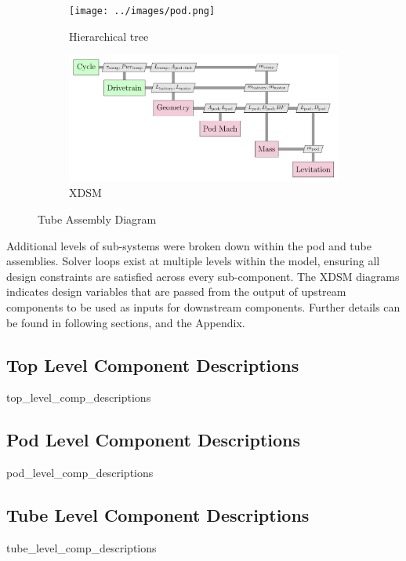 \begin{figure}
\centering
\begin{subfigure}{.5\textwidth}
  \centering
  \texttt{[image: ../images/pod.png]}
  \caption{Hierarchical tree}
  \label{fig:tree:pod}
\end{subfigure}%
\begin{subfigure}{.5\textwidth}
  \centering
  \includegraphics{../images/xdsm/pod.pdf}
  \caption{XDSM}
  \label{fig:xdsm:pod}
\end{subfigure}
\caption{Tube Assembly Diagram}
\label{fig:pod}
\end{figure}

Additional levels of sub-systems were broken down within the pod and tube assemblies.
Solver loops exist at multiple levels within the model, ensuring all design
constraints are satisfied across every sub-component.
The XDSM diagrams indicates design variables that are passed from the output of
upstream components to be used as inputs for downstream components.
Further details can be found in following sections, and the Appendix.

\subsection{Top Level Component Descriptions}
	{top_level_comp_descriptions}
\subsection{Pod Level Component Descriptions}
	{pod_level_comp_descriptions}
\subsection{Tube Level Component Descriptions}
	{tube_level_comp_descriptions}


